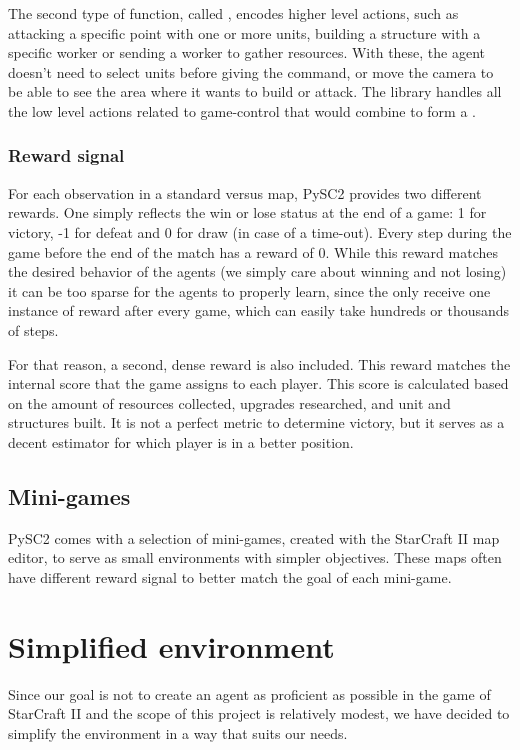 The second type of function, called , encodes higher level actions, such as attacking a specific point with one or more units, building a structure with a specific worker or sending a worker to gather resources. With these, the agent doesn't need to select units before giving the command, or move the camera to be able to see the area where it wants to build or attack. The library handles all the low level  actions related to game-control that would combine to form a .

\subsubsection*{Reward signal}
\label{sec:reward_signal}

For each observation in a standard versus map, PySC2 provides two different rewards. One simply reflects the win or lose status at the end of a game: 1 for victory, -1 for defeat and 0 for draw (in case of a time-out). Every step during the game before the end of the match has a reward of 0. While this reward matches the desired behavior of the agents (we simply care about winning and not losing) it can be too sparse for the agents to properly learn, since the only receive one instance of reward after every game, which can easily take hundreds or thousands of steps.

For that reason, a second, dense reward is also included. This reward matches the internal score that the game assigns to each player. This score is calculated based on the amount of resources collected, upgrades researched, and unit and structures built. It is not a perfect metric to determine victory, but it serves as a decent estimator for which player is in a better position.

\subsection{Mini-games}

PySC2 comes with a selection of mini-games, created with the StarCraft II map editor, to serve as small environments with simpler objectives. These maps often have different reward signal to better match the goal of each mini-game.

\section{Simplified environment}

Since our goal is not to create an agent as proficient as possible in the game of StarCraft II and the scope of this project is relatively modest, we have decided to simplify the environment in a way that suits our needs.

